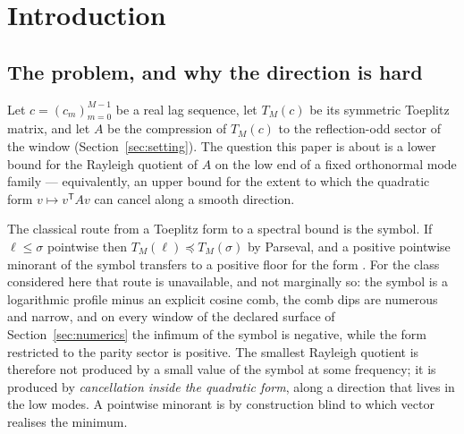 \documentclass[11pt,a4paper]{article}
\theoremstyle{plain}
\theoremstyle{definition}
\newcommand{\T}{\mathsf{T}}
\newcommand{\Tm}[1]{T_{#1}}
\begin{document}
\begin{abstract}
certifies, the best of them short of the demanded one by two units in the
exponent; five structural obstructions, each exhibited failing; a curve of the
binned exponent against comb density over four decades of density, whose densest
bins are consistent with zero and whose undecidability under the declared caps is
part of the claim; and two controlled placement experiments, the second of which
closes into an exact identity for the response of the ratio to a displacement of
comb nodes inside their lag cells. Randomising the node positions at fixed
weights leaves every theorem here intact and removes the phenomenon: the
arithmetic enters the theorems only as the source of the comb positions and
weights, and every statement proved here holds for an arbitrary finite comb.
\end{abstract}

\section{Introduction}
\label{sec:intro}

\subsection{The problem, and why the direction is hard}
\label{sec:problem}

Let $c=(c_m)_{m=0}^{M-1}$ be a real lag sequence, let $\Tm{M}(c)$ be its
symmetric Toeplitz matrix, and let $A$ be the compression of $\Tm{M}(c)$ to the
reflection-odd sector of the window (Section~\ref{sec:setting}). The question
this paper is about is a lower bound for the Rayleigh quotient of $A$ on the low
end of a fixed orthonormal mode family --- equivalently, an upper bound for the
extent to which the quadratic form $v\mapsto v^{\T}Av$ can cancel along a smooth
direction.

The classical route from a Toeplitz form to a spectral bound is the symbol. If
$\ell\le\sigma$ pointwise then $\Tm{M}(\ell)\preceq\Tm{M}(\sigma)$ by Parseval,
and a positive pointwise minorant of the symbol transfers to a positive floor
for the form \cite{Szego1939,GrenanderSzego1958,KMS1953,Dirichlet1829,Fejer1916}. For the
class considered here that route is unavailable, and not marginally so: the
symbol is a logarithmic profile minus an explicit cosine comb, the comb dips are
numerous and narrow, and on every window of the declared surface of
Section~\ref{sec:numerics} the infimum of the symbol is negative, while the form
restricted to the parity sector is positive. The smallest Rayleigh quotient is
therefore not produced by a small value of the symbol at some frequency; it is
produced by \emph{cancellation inside the quadratic form}, along a direction that
lives in the low modes. A pointwise minorant is by construction blind to which
vector realises the minimum.
\end{document}
